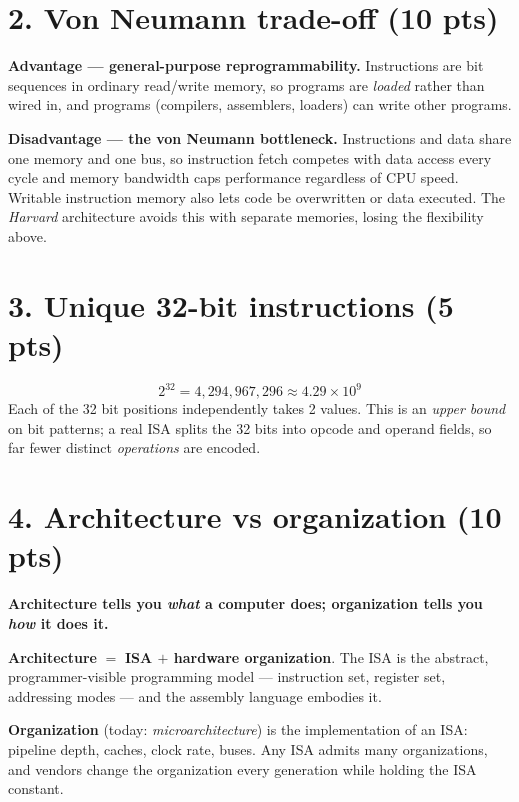 \section*{2. Von Neumann trade-off \normalsize(10 pts)}

\textbf{Advantage — general-purpose reprogrammability.} Instructions are bit
sequences in ordinary read/write memory, so programs are \emph{loaded} rather
than wired in, and programs (compilers, assemblers, loaders) can write other
programs.

\textbf{Disadvantage — the von Neumann bottleneck.} Instructions and data share
one memory and one bus, so instruction fetch competes with data access every
cycle and memory bandwidth caps performance regardless of CPU speed. Writable
instruction memory also lets code be overwritten or data executed. The
\emph{Harvard} architecture avoids this with separate memories, losing the
flexibility above.

\section*{3. Unique 32-bit instructions \normalsize(5 pts)}

$$2^{32} = 4{,}294{,}967{,}296 \approx 4.29\times10^{9}$$
Each of the 32 bit positions independently takes 2 values. This is an
\emph{upper bound} on bit patterns; a real ISA splits the 32 bits into opcode
and operand fields, so far fewer distinct \emph{operations} are encoded.

\section*{4. Architecture vs organization \normalsize(10 pts)}

\textbf{Architecture tells you \emph{what} a computer does; organization tells
you \emph{how} it does it.}

\textbf{Architecture} $=$ \textbf{ISA $+$ hardware organization}. The ISA is the
abstract, programmer-visible programming model — instruction set, register set,
addressing modes — and the assembly language embodies it.

\textbf{Organization} (today: \emph{microarchitecture}) is the implementation of
an ISA: pipeline depth, caches, clock rate, buses. Any ISA admits many
organizations, and vendors change the organization every generation while
holding the ISA constant.

